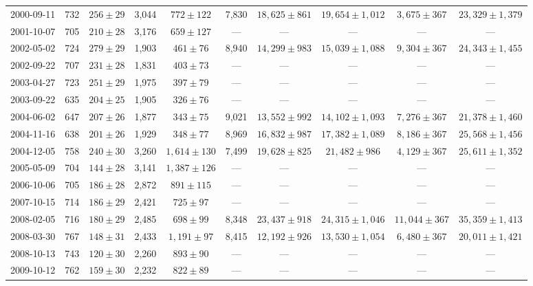 \begin{landscape}
\begin{longtable}{cccccccccc}
{2000-09-11} & 732 & {$256  \pm  29$} & 3,044 & {$772 \pm 122$} & 7,830 & {$18,625 \pm 861$} & {$19,654 \pm 1,012$} & {$3,675 \pm 367$} & {$23,329 \pm 1,379$} \\
{2001-10-07} & 705 & {$210  \pm  28$} & 3,176 & {$659 \pm 127$} & --- & --- & --- & --- & --- \\
{2002-05-02} & 724 & {$279  \pm  29$} & 1,903 & {$461 \pm 76$} & 8,940 & {$14,299 \pm 983$} & {$15,039 \pm 1,088$} & {$9,304 \pm 367$} & {$24,343 \pm 1,455$} \\
{2002-09-22} & 707 & {$231  \pm  28$} & 1,831 & {$403 \pm 73$} & --- & --- & --- & --- & --- \\
{2003-04-27} & 723 & {$251  \pm  29$} & 1,975 & {$397 \pm 79$} & --- & --- & --- & --- & --- \\
{2003-09-22} & 635 & {$204  \pm  25$} & 1,905 & {$326 \pm 76$} & --- & --- & --- & --- & --- \\
{2004-06-02} & 647 & {$207  \pm  26$} & 1,877 & {$343 \pm 75$} & 9,021 & {$13,552 \pm 992$} & {$14,102 \pm 1,093$} & {$7,276 \pm 367$} & {$21,378 \pm 1,460$} \\
{2004-11-16} & 638 & {$201  \pm  26$} & 1,929 & {$348 \pm 77$} & 8,969 & {$16,832 \pm 987$} & {$17,382 \pm 1,089$} & {$8,186 \pm 367$} & {$25,568 \pm 1,456$} \\
{2004-12-05} & 758 & {$240  \pm  30$} & 3,260 & {$1,614 \pm 130$} & 7,499 & {$19,628 \pm 825$} & {$21,482 \pm 986$} & {$4,129 \pm 367$} & {$25,611 \pm 1,352$} \\
{2005-05-09} & 704 & {$144  \pm  28$} & 3,141 & {$1,387 \pm 126$} & --- & --- & --- & --- & --- \\
{2006-10-06} & 705 & {$186  \pm  28$} & 2,872 & {$891 \pm 115$} & --- & --- & --- & --- & --- \\
{2007-10-15} & 714 & {$186  \pm  29$} & 2,421 & {$725 \pm 97$} & --- & --- & --- & --- & --- \\
{2008-02-05} & 716 & {$180  \pm  29$} & 2,485 & {$698 \pm 99$} & 8,348 & {$23,437 \pm 918$} & {$24,315 \pm 1,046$} & {$11,044 \pm 367$} & {$35,359 \pm 1,413$} \\
{2008-03-30} & 767 & {$148  \pm  31$} & 2,433 & {$1,191 \pm 97$} & 8,415 & {$12,192 \pm 926$} & {$13,530 \pm 1,054$} & {$6,480 \pm 367$} & {$20,011 \pm 1,421$} \\
{2008-10-13} & 743 & {$120  \pm  30$} & 2,260 & {$893 \pm 90$} & --- & --- & --- & --- & --- \\
{2009-10-12} & 762 & {$159  \pm  30$} & 2,232 & {$822 \pm 89$} & --- & --- & --- & --- & --- \\

\end{longtable}
\end{landscape}
